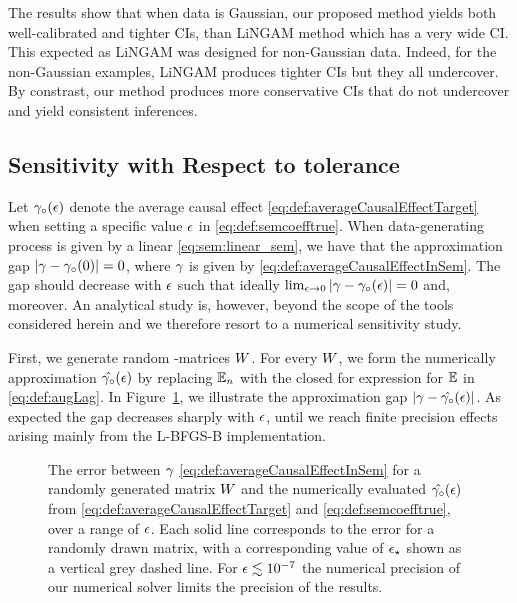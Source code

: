The results show that when data is Gaussian, our proposed method yields both well-calibrated and tighter CIs, than LiNGAM method which has a very wide CI. This expected as LiNGAM was designed for non-Gaussian data. Indeed, for the non-Gaussian examples, LiNGAM produces tighter CIs but they all undercover. By constrast, our method produces more conservative CIs that do not undercover and yield consistent inferences.






\subsection{Sensitivity with Respect to \DAG{} tolerance}
\label{subsection:numerics:sensitivity}
Let $\gamma_\circ(\epsilon)$ denote the average causal effect  \eqref{eq:def:averageCausalEffectTarget} when setting a specific value $\epsilon$ in \eqref{eq:def:semcoefftrue}. When data-generating process is given by a linear \scm  \eqref{eq:sem:linear_sem}, we have that the approximation gap $|\gamma - \gamma_\circ(0)| = 0$, where $\gamma$ is given by \eqref{eq:def:averageCausalEffectInSem}.
The gap should decrease with $\epsilon$ such that ideally $\lim_{\epsilon \to 0} |\gamma - \gamma_\circ(\epsilon)|=0$  and, moreover. An analytical study is, however, beyond the scope of the tools considered herein and we therefore resort to a numerical sensitivity study.

First, we generate random \DAG{}-matrices $W$. For every $W$, we form the numerically approximation $\hat{\gamma_\circ}(\epsilon)$ by replacing $\mathbb{E}_n$ with the closed for expression for $\mathbb{E}$ in \eqref{eq:def:augLag}. In Figure~\ref{fig:epsilon-limit}, we illustrate the approximation gap $|\gamma - \hat{\gamma_\circ}(\epsilon)|$. As expected the gap decreases sharply with $\epsilon$, until we reach finite precision effects arising mainly from the L-BFGS-B implementation.

\begin{figure}
     \centering
     
     \caption{The error between $\gamma$ \eqref{eq:def:averageCausalEffectInSem} for a randomly generated matrix $W$ and the numerically evaluated $\hat{\gamma_\circ}(\epsilon)$ from \eqref{eq:def:averageCausalEffectTarget} and \eqref{eq:def:semcoefftrue}, over a range of $\epsilon$. Each solid line corresponds to the error for a randomly drawn matrix, with a corresponding value of $\epsilon_\star$ shown as a vertical grey dashed line.
          For $\epsilon \lesssim 10^{-7}$ the numerical precision of our numerical solver limits the precision of the results.
     }
     \label{fig:epsilon-limit}
\end{figure}

